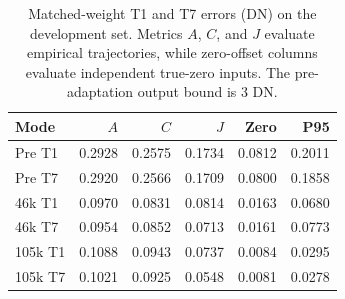 \begin{table}[!t]
\centering
\caption{Matched-weight T1 and T7 errors (DN) on the development set. Metrics $A$, $C$, and $J$ evaluate empirical trajectories, while zero-offset columns evaluate independent true-zero inputs. The pre-adaptation output bound is 3 DN.}\label{tab:metrics}
\footnotesize
\setlength{\tabcolsep}{2pt}
\begin{tabular}{lrrrrr}
\toprule
Mode & $A$ & $C$ & $J$ & Zero & P95 \\
\midrule
Pre T1 & 0.2928 & 0.2575 & 0.1734 & 0.0812 & 0.2011 \\
Pre T7 & 0.2920 & 0.2566 & 0.1709 & 0.0800 & 0.1858 \\
46k T1 & 0.0970 & 0.0831 & 0.0814 & 0.0163 & 0.0680 \\
46k T7 & 0.0954 & 0.0852 & 0.0713 & 0.0161 & 0.0773 \\
105k T1 & 0.1088 & 0.0943 & 0.0737 & 0.0084 & 0.0295 \\
105k T7 & 0.1021 & 0.0925 & 0.0548 & 0.0081 & 0.0278 \\
\bottomrule
\end{tabular}
\end{table}
